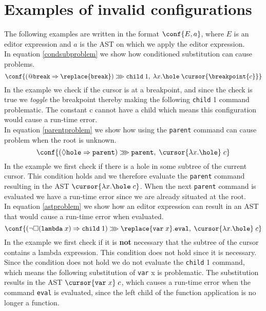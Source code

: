\section{Examples of invalid configurations}
The following examples are written in the format $\conf{E, a}$, where $E$ is an editor expression and $a$ is the AST on which we apply the editor expression. \\

In equation \ref{condsubproblem} we show how conditioned substitution can cause problems.
\begin{equation}
    \conf{\left(@\texttt{break} \Rightarrow \replace{\texttt{break}}\right) \ggg \texttt{child}\; 1,\; \lambda x.\hole\; \cursor{\breakpoint{c}}} \label{condsubproblem}
\end{equation}
 In the example we check if the cursor is at a breakpoint, and since the check is true we \textit{toggle} the breakpoint thereby making the following \texttt{child} 1 command problematic. The constant c cannot have a child which means this configuration would cause a run-time error. \\
 
In equation \ref{parentproblem} we show how using the \texttt{parent} command can cause problem when the root is unknown.
\begin{equation}
    \conf{\left(\lozenge\texttt{hole} \Rightarrow \texttt{parent}\right) \ggg \texttt{parent},\; \cursor{\lambda x.\hole}\; c} \label{parentproblem}
\end{equation}
In the example we first check if there is a hole in some subtree of the current cursor. This condition holds and we therefore evaluate the \texttt{parent} command resulting in the AST $\cursor{\lambda x.\hole\; c}$. When the next \texttt{parent} command is evaluated we have a run-time error since we are already situated at the root.\\

In equation \ref{astproblem} we show how an editor expression can result in an AST that would cause a run-time error when evaluated.
\begin{equation}
    \conf{\left(\neg\Box(\texttt{lambda}\; x) \Rightarrow \texttt{child}\; 1\right) \ggg \replace{\texttt{var}\; x}.\texttt{eval},\; \cursor{\lambda x.\hole}\; c} \label{astproblem}
\end{equation}
In the example we first check if it is \textbf{not} necessary that the subtree of the cursor contains a lambda expression. This condition does not hold since it is necessary. Since the condition does not hold we do not evaluate the \texttt{child} 1 command, which means the following substitution of \texttt{var} x is problematic. The substitution results in the AST $\cursor{\texttt{var}\; x}\; c$, which causes a run-time error when the command \texttt{eval} is evaluated, since the left child of the function application is no longer a function.
%

